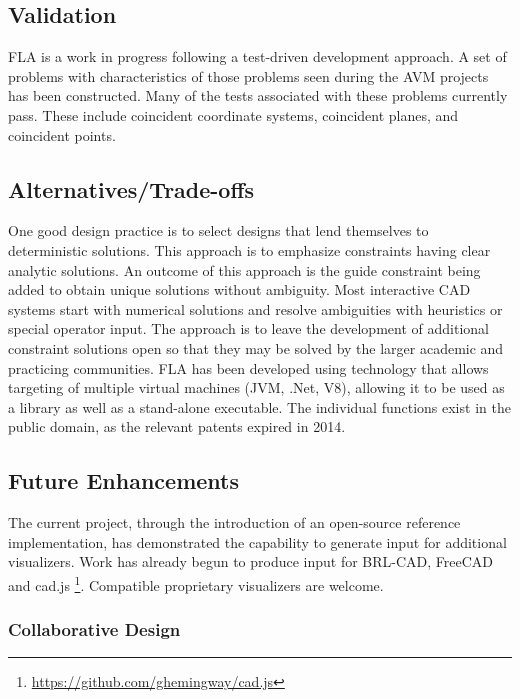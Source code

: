 \documentclass[]{report}
\begin{document}
\subsection{Validation} 

FLA is a work in progress following a test-driven development approach. 
A set of problems with characteristics of those problems seen during the AVM projects has been constructed. 
Many of the tests associated with these problems currently pass. 
These include coincident coordinate systems, coincident planes, and coincident points.
 
\subsection{Alternatives/Trade-offs}

One good design practice is to select designs that lend themselves to deterministic solutions. 
This approach is to emphasize constraints having clear analytic solutions. 
An outcome of this approach is the guide constraint being added to obtain unique solutions without ambiguity.
Most interactive CAD systems start with numerical solutions and resolve ambiguities 
with heuristics or special operator input. The approach is to leave 
the development of additional constraint solutions open so that they
may be solved by the larger academic and practicing communities. 
FLA has been developed using technology that allows targeting 
of multiple virtual machines (JVM, .Net, V8), allowing it 
to be used as a library as well as a stand-alone executable. 
The individual functions exist in the public domain, as the relevant patents expired in 2014.

\subsection{Future Enhancements}

The current project, through the introduction of an open-source reference implementation, 
has demonstrated the capability to generate input for additional visualizers. 
Work has already begun to produce input for BRL-CAD, FreeCAD and cad.js \footnote{\url{https://github.com/ghemingway/cad.js}}. 
Compatible proprietary visualizers are welcome.

\subsubsection{Collaborative Design}
\end{document}
